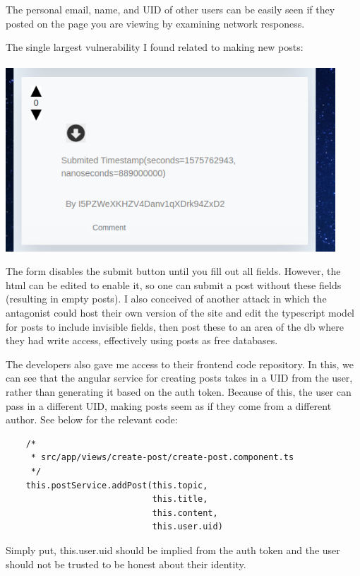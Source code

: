 The personal email, name, and UID of other users can be easily seen if they posted on the page you are viewing by examining network responess.

The single largest vulnerability I found related to making new posts:
\\\\
\includegraphics[width = 350pt ]{images/vuln.png}

The form disables the submit button until you fill out all fields. However, the html can be edited to enable it, so one can submit a post without these fields (resulting in empty posts). I also conceived of another attack in which the antagonist could host their own version of the site and edit the typescript model for posts to include invisible fields, then post these to an area of the db where they had write access, effectively using posts as free databases.

The developers also gave me access to their frontend code repository. In this, we can see that the angular service for creating posts takes in a UID from the user, rather than generating it based on the auth token. Because of this, the user can pass in a different UID, making posts seem as if they come from a different author. See below for the relevant code:
\begin{verbatim}
    /* 
     * src/app/views/create-post/create-post.component.ts
     */
    this.postService.addPost(this.topic,
                             this.title,
                             this.content,
                             this.user.uid)
\end{verbatim}

Simply put, this.user.uid should be implied from the auth token and the user should not be trusted to be honest about their identity.

